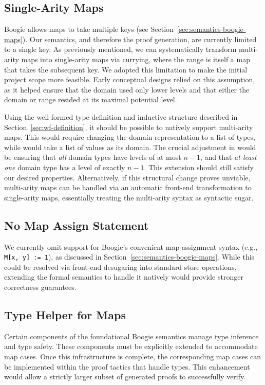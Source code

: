 \subsection{Single-Arity Maps}
Boogie allows maps to take multiple keys (see Section~\ref{sec:semantics-boogie-maps}).
Our semantics, and therefore the proof generation, are currently limited to a single key.
As previously mentioned, we can systematically transform multi-arity maps into single-arity maps via currying,
where the range is itself a map that takes the subsequent key.
We adopted this limitation to make the initial project scope more feasible.
Early conceptual designs relied on this assumption,
as it helped ensure that the domain used only lower levels
and that either the domain or range resided at its maximal potential level.

Using the well-formed type definition and inductive structure described in Section~\ref{sec:wf-definition},
it should be possible to natively support multi-arity maps.
This would require changing the domain representation to a list of types,
while  would take a list of values as its domain.
The crucial adjustment in  would be ensuring that \emph{all} domain types have levels of at most $n-1$,
and that \emph{at least one} domain type has a level of exactly $n-1$.
This extension should still satisfy our desired properties.
Alternatively, if this structural change proves unviable,
multi-arity maps can be handled via an automatic front-end transformation to single-arity maps,
essentially treating the multi-arity syntax as syntactic sugar.


\subsection{No Map Assign Statement}
We currently omit support for Boogie's convenient map assignment syntax (e.g., \lstinline[columns=fixed]{M[x, y] := 1}), as discussed in Section~\ref{sec:semantics-boogie-maps}.
While this could be resolved via front-end desugaring into standard store operations,
extending the formal semantics to handle it natively would provide stronger correctness guarantees.

\subsection{Type Helper for Maps}
Certain components of the foundational Boogie semantics manage type inference and type safety.
These components must be explicitly extended to accommodate map cases.
Once this infrastructure is complete, the corresponding map cases can be implemented within the  proof tactics that handle types.
This enhancement would allow a strictly larger subset of generated proofs to successfully verify.

